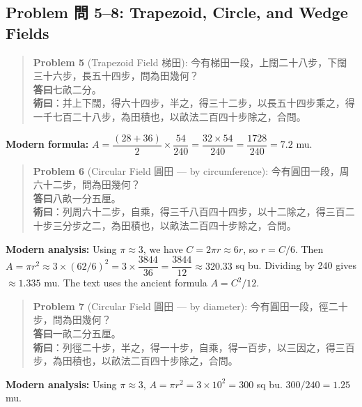 \documentclass[11pt,a4paper]{article}
\newenvironment{problembox}{%
  \begin{quote}
  \itshape
  \color{problemcolor}
}{%
  \end{quote}
}
\begin{document}
\subsection{Problem 問 5--8: Trapezoid, Circle, and Wedge Fields}

\begin{problembox}
\textbf{Problem 5} (Trapezoid Field 梯田): 今有梯田一段，上闊二十八步，下闊三十六步，長五十四步，問為田幾何？\\[0.2cm]
\textbf{答曰}七畝二分。\\[0.2cm]
\textbf{術曰}：并上下闊，得六十四步，半之，得三十二步，以長五十四步乘之，得一千七百二十八步，為田積也，以畝法二百四十步除之，合問。
\end{problembox}

\textbf{Modern formula:} $A = \dfrac{(28 + 36)}{2} \times \dfrac{54}{240} = \dfrac{32 \times 54}{240} = \dfrac{1728}{240} = 7.2$ mu.

\vspace{0.3cm}

\begin{problembox}
\textbf{Problem 6} (Circular Field 圓田 --- by circumference): 今有圓田一段，周六十二步，問為田幾何？\\[0.2cm]
\textbf{答曰}八畝一分五厘。\\[0.2cm]
\textbf{術曰}：列周六十二步，自乘，得三千八百四十四步，以十二除之，得三百二十步三分步之二，為田積也，以畝法二百四十步除之，合問。
\end{problembox}

\textbf{Modern analysis:} Using $\pi \approx 3$, we have $C = 2\pi r \approx 6r$, so $r = C/6$. Then $A = \pi r^2 \approx 3 \times (62/6)^2 = 3 \times \dfrac{3844}{36} = \dfrac{3844}{12} \approx 320.33$ sq bu. Dividing by 240 gives $\approx 1.335$ mu. The text uses the ancient formula $A = C^2 / 12$.

\vspace{0.3cm}

\begin{problembox}
\textbf{Problem 7} (Circular Field 圓田 --- by diameter): 今有圓田一段，徑二十步，問為田幾何？\\[0.2cm]
\textbf{答曰}一畝二分五厘。\\[0.2cm]
\textbf{術曰}：列徑二十步，半之，得一十步，自乘，得一百步，以三因之，得三百步，為田積也，以畝法二百四十步除之，合問。
\end{problembox}

\textbf{Modern analysis:} Using $\pi \approx 3$, $A = \pi r^2 = 3 \times 10^2 = 300$ sq bu. $300/240 = 1.25$ mu.
\end{document}
